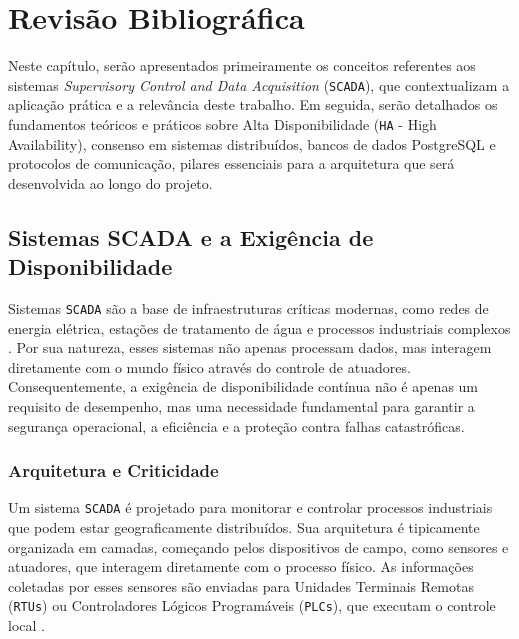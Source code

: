 \chapter{Revisão Bibliográfica}
\label{revisao}
    Neste capítulo, serão apresentados primeiramente os conceitos referentes aos sistemas \textit{Supervisory Control and Data Acquisition} (\verb|SCADA|), que contextualizam a aplicação prática e a relevância deste trabalho. Em seguida, serão detalhados os fundamentos teóricos e práticos sobre Alta Disponibilidade (\verb|HA| - High Availability), consenso em sistemas distribuídos, bancos de dados PostgreSQL e protocolos de comunicação, pilares essenciais para a arquitetura que será desenvolvida ao longo do projeto.

\section{Sistemas SCADA e a Exigência de Disponibilidade}

    Sistemas \verb|SCADA| são a base de infraestruturas críticas modernas, como redes de energia elétrica, estações de tratamento de água e processos industriais complexos \cite{alanazi2023}. Por sua natureza, esses sistemas não apenas processam dados, mas interagem diretamente com o mundo físico através do controle de atuadores. Consequentemente, a exigência de disponibilidade contínua não é apenas um requisito de desempenho, mas uma necessidade fundamental para garantir a segurança operacional, a eficiência e a proteção contra falhas catastróficas.

    \subsection{Arquitetura e Criticidade}

        Um sistema \verb|SCADA| é projetado para monitorar e controlar processos industriais que podem estar geograficamente distribuídos. Sua arquitetura é tipicamente organizada em camadas, começando pelos dispositivos de campo, como sensores e atuadores, que interagem diretamente com o processo físico. As informações coletadas por esses sensores são enviadas para Unidades Terminais Remotas (\verb|RTUs|) ou Controladores Lógicos Programáveis (\verb|PLCs|), que executam o controle local \cite{yadav2021}.

